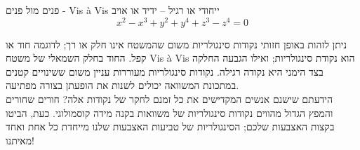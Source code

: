 \begin{surferPage}{%
פנים מול פנים - Vis \`a Vis%
}
ייחודי או רגיל – ידיד או אויב
\smallskip
\[x^2	- x^3+ y^2+ y^4+ z^3- z^4	=  0\]

\vspace{0,3cm}
ניתן לזהות באופן חזותי נקודות סינגולריות משום שהמשטח אינו חלק או רך; לדוגמה חוד או קפל.
\vspace{0,3cm}
החוד בחלק השמאלי של משטח Vis \`a Vis הוא נקודת סינגולריות; ואילו הגבעה החלקה בצד הימני היא נקודה רגילה. נקודות סינגולריות מעוררות עניין משום ששינויים קטנים במתכונת המשוואה יכולים לשנות את הופעתן בצורה מפתיעה. \\

\vspace{0,3cm}
הידעתם שישנם אנשים המקדישים את כל זמנם לחקר של נקודות אלה? חורים שחורים והמפץ הגדול מהווים נקודות סינגולריות של משוואות בקנה מידה קוסמולוגי. כעת, הביטו בקצות האצבעות שלכם; הסינגולריות של טביעות האצבעות שלנו מייחדת כל אחת ואחד מאיתנו!
\end{surferPage}
